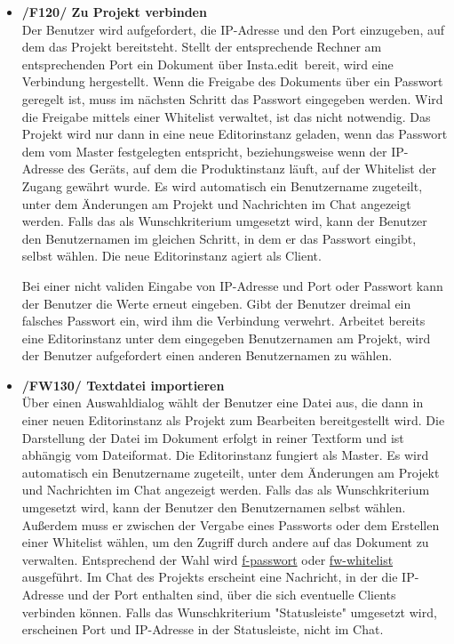 \documentclass{scrartcl}
\makeatletter
\newcommand{\name}{Insta.edit}
\newcommand{\labelFunction}[2]{%
	\Hy@raisedlink{\hypertarget{#1}{}%
    \protected@write\@mainaux{}{%
        \string\expandafter\string\gdef
          \string\csname\string\detokenize{#1}\string\endcsname{#2}%
    }%
  }%
  #2
 }
\newcommand{\refFunction}[1]{%
  \hyperlink{#1}{\csname #1\endcsname}%
  }
\makeatother
\begin{document}
\begin{itemize}
\item \textbf{\labelFunction{f-verbinde}{/F120/} Zu Projekt verbinden} \\
Der Benutzer wird aufgefordert, die IP-Adresse und den Port einzugeben, auf dem das Projekt bereitsteht. Stellt der entsprechende Rechner am entsprechenden Port ein Dokument über \name\ bereit, wird eine Verbindung hergestellt. Wenn die Freigabe des Dokuments über ein Passwort geregelt ist, muss im nächsten Schritt das Passwort eingegeben werden. Wird die Freigabe mittels einer Whitelist verwaltet, ist das nicht notwendig. Das Projekt wird nur dann in eine neue Editorinstanz geladen, wenn das Passwort dem vom Master festgelegten entspricht, beziehungsweise wenn der IP-Adresse des Geräts, auf dem die Produktinstanz läuft, auf der Whitelist der Zugang gewährt wurde. Es wird automatisch ein Benutzername zugeteilt, unter dem Änderungen am Projekt und Nachrichten im Chat angezeigt werden. Falls das als Wunschkriterium umgesetzt wird, kann der Benutzer den Benutzernamen im gleichen Schritt, in dem er das Passwort eingibt, selbst wählen. Die neue Editorinstanz agiert als Client.

Bei einer nicht validen Eingabe von IP-Adresse und Port oder Passwort kann der Benutzer die Werte erneut eingeben. Gibt der Benutzer dreimal ein falsches Passwort ein, wird ihm die Verbindung verwehrt. Arbeitet bereits eine Editorinstanz unter dem eingegeben Benutzernamen am Projekt, wird der Benutzer aufgefordert einen anderen Benutzernamen zu wählen.

\item \textbf{\labelFunction{fw-import}{/FW130/} Textdatei importieren} \\
Über einen Auswahldialog wählt der Benutzer eine Datei aus, die dann in einer neuen Editorinstanz als Projekt zum Bearbeiten bereitgestellt wird. Die Darstellung der Datei im Dokument erfolgt in reiner Textform und ist abhängig vom Dateiformat. Die Editorinstanz fungiert als Master. Es wird automatisch ein Benutzername zugeteilt, unter dem Änderungen am Projekt und Nachrichten im Chat angezeigt werden. Falls das als Wunschkriterium umgesetzt wird, kann der Benutzer den Benutzernamen selbst wählen. Außerdem muss er zwischen der Vergabe eines Passworts oder dem Erstellen einer Whitelist wählen, um den Zugriff durch andere auf das Dokument zu verwalten. Entsprechend der Wahl wird \refFunction{f-passwort} oder \refFunction{fw-whitelist} ausgeführt. Im Chat des Projekts erscheint eine Nachricht, in der die IP-Adresse und der Port enthalten sind, über die sich eventuelle Clients verbinden können. Falls das Wunschkriterium "Statusleiste" umgesetzt wird, erscheinen Port und IP-Adresse in der Statusleiste, nicht im Chat.


\end{itemize}
\end{document}
